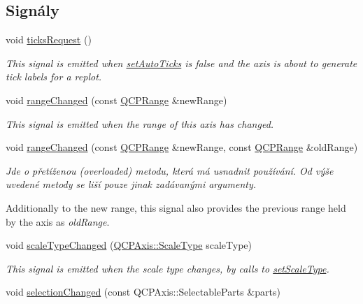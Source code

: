 \subsection*{Signály}
\begin{DoxyCompactItemize}
\item 
void \hyperlink{classQCPAxis_af46d99613d29518795134ec4928e3873}{ticks\+Request} ()
\begin{DoxyCompactList}\small\item\em This signal is emitted when \hyperlink{classQCPAxis_ae867c23d3a6a7bd4d09cc66c5d018f63}{set\+Auto\+Ticks} is false and the axis is about to generate tick labels for a replot. \end{DoxyCompactList}\item 
void \hyperlink{classQCPAxis_a0894084e4c16a1736534c4095746f910}{range\+Changed} (const \hyperlink{classQCPRange}{Q\+C\+P\+Range} \&new\+Range)
\begin{DoxyCompactList}\small\item\em This signal is emitted when the range of this axis has changed. \end{DoxyCompactList}\item 
\hypertarget{classQCPAxis_aac8576288e8e31f16186124bc10dd10d}{}void \hyperlink{classQCPAxis_aac8576288e8e31f16186124bc10dd10d}{range\+Changed} (const \hyperlink{classQCPRange}{Q\+C\+P\+Range} \&new\+Range, const \hyperlink{classQCPRange}{Q\+C\+P\+Range} \&old\+Range)\label{classQCPAxis_aac8576288e8e31f16186124bc10dd10d}

\begin{DoxyCompactList}\small\item\em Jde o přetíženou (overloaded) metodu, která má usnadnit používání. Od výše uvedené metody se liší pouze jinak zadávanými argumenty.

Additionally to the new range, this signal also provides the previous range held by the axis as {\itshape old\+Range}. \end{DoxyCompactList}\item 
\hypertarget{classQCPAxis_a3505ed8a93bd2e349d858d84996bf767}{}void \hyperlink{classQCPAxis_a3505ed8a93bd2e349d858d84996bf767}{scale\+Type\+Changed} (\hyperlink{classQCPAxis_a36d8e8658dbaa179bf2aeb973db2d6f0}{Q\+C\+P\+Axis\+::\+Scale\+Type} scale\+Type)\label{classQCPAxis_a3505ed8a93bd2e349d858d84996bf767}

\begin{DoxyCompactList}\small\item\em This signal is emitted when the scale type changes, by calls to \hyperlink{classQCPAxis_adef29cae617af4f519f6c40d1a866ca6}{set\+Scale\+Type}. \end{DoxyCompactList}\item 
\hypertarget{classQCPAxis_a62b598abeee7174a05f9d542cc85b1f5}{}void \hyperlink{classQCPAxis_a62b598abeee7174a05f9d542cc85b1f5}{selection\+Changed} (const Q\+C\+P\+Axis\+::\+Selectable\+Parts \&parts)\label{classQCPAxis_a62b598abeee7174a05f9d542cc85b1f5}


\end{DoxyCompactItemize}
